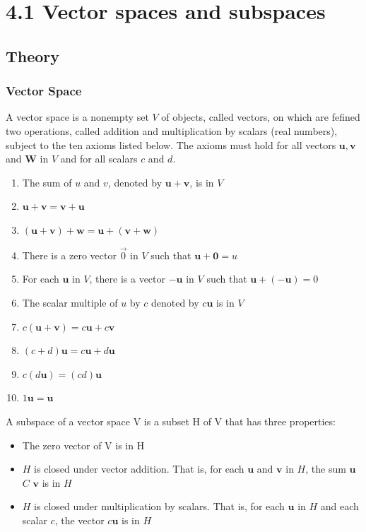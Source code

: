 \section*{4.1 Vector spaces and subspaces}
  \subsection*{Theory}
 
    \subsubsection*{Vector Space}
    \begin{mydef}\label{vector space}
      A vector space is a nonempty set $ V $ of objects, called vectors, on which are fefined two operations, called addition and multiplication by scalars (real numbers), subject to the ten axioms listed below. The axioms must hold for all vectors $ \mathbf u, \mathbf v $ and  $ \mathbf W $ in $ V $ and for all scalars $ c $ and $ d $.
      \begin{enumerate}
        \item The sum of $ u $ and $ v $, denoted by $ \mathbf u + \mathbf v $, is in $ V $
        \item $ \mathbf u + \mathbf v = \mathbf v + \mathbf u $
        \item $ (\mathbf u + \mathbf v) + \mathbf w = \mathbf u + (\mathbf v + \mathbf w)  $
        \item There is a zero vector $ \vec{0} $ in $ V $ such that $ \mathbf u + \mathbf 0 = u $
        \item For each $ \mathbf u $ in $ V $, there is a vector $ - \mathbf u $ in $ V $ such that $ \mathbf u + (-\mathbf u) = 0 $
        \item The scalar multiple of $ u $ by $ c $ denoted by $ c \mathbf u $ is in $ V $
        \item $ c (\mathbf{u + v}) = c \mathbf u + c \mathbf v $
        \item $ (c+d)\mathbf u = c \mathbf u + d \mathbf u $
        \item $ c(d \mathbf u) = (cd) \mathbf u $
        \item $ 1 \mathbf u  = \mathbf u $
      \end{enumerate}

    \end{mydef}

    \begin{mydef}\label{subspace}
      A subspace of a vector space V is a subset H of V that has three properties:
      \begin{itemize}
        \item The zero vector of V is in H
        \item $H$ is closed under vector addition. That is, for each $  \mathbf  u $ and $ \mathbf  v$ in $H$, the sum $ \mathbf  u$ $C$ $ \mathbf  v$
        is in $H$
        \item $H$ is closed under multiplication by scalars. That is, for each $ \mathbf  u$ in $H$ and each
        scalar $c$, the vector $c \mathbf  u$ is in $H$        
      \end{itemize}
    \end{mydef}

